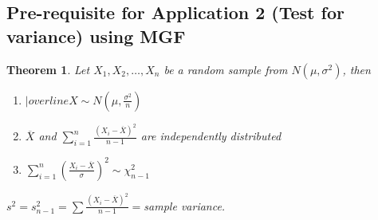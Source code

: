 \documentclass[oneside,11pt,pdftex]{book}%
\numberwithin{equation}{section}
\newtheorem{theorem}{Theorem}[chapter]%
\numberwithin{section}{chapter}
\numberwithin{equation}{chapter}
\begin{document}
\subsection{Pre-requisite for Application 2 (Test for variance) using MGF}
\begin{theorem}
	Let $ X_1, X_2, \dots, X_n $ be a random sample from $ N(\mu, \sigma^2) $, then 
	\begin{enumerate}
		\item $ |overline
		X \sim N\left(\mu, \frac{\sigma^2}{n}\right)$
		\item $ \overline{X} $ and $ \sum_{i=1}^n \frac{(X_i-\overline{X})^2}{n-1} $ are independently distributed
		\item $ \sum_{i=1}^n \left(\frac{X_i-\overline{X}}{\sigma}\right)^2\sim \chi^2_{n-1} $
	\end{enumerate}
	$ s^2=s^2_{n-1}=\sum \frac{(X_i-\overline{X})^2}{n-1} =$sample variance.
\end{theorem}
\end{document}
